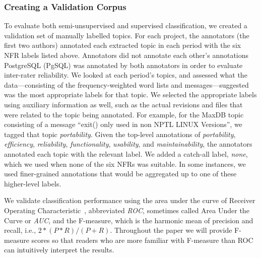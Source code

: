 \documentclass[smallextended]{svjour3}       %
\begin{document}

\subsubsection{Creating a Validation Corpus}
To evaluate both semi-unsupervised and supervised classification, we
created a validation set of manually labelled topics. For each project,
 the annotators (the first two authors) annotated each extracted topic in each period with
the six NFR labels listed above.
Annotators did not annotate each other's annotations
PostgreSQL (PgSQL) was annotated by both annotators in order
to evaluate inter-rater reliability.
We looked at each period's topics, and assessed what the data---consisting of the frequency-weighted word lists and messages---suggested was the most appropriate labels for that topic. 
We selected the appropriate labels using auxiliary information as well, such as the actual revisions and files that were related to the
topic being annotated.
For example, for the MaxDB topic consisting of a message ``exit() only
used in non NPTL LINUX Versions'', we tagged that topic
\emph{portability}. 
Given the top-level annotations of \emph{portability},
\emph{efficiency}, \emph{reliability}, \emph{functionality},
\emph{usability}, and \emph{maintainability}, the annotators annotated each topic
with the relevant label. We added a catch-all label, \emph{none}, which we used when none of the six NFRs was suitable. In some instances, we used finer-grained
annotations that would be aggregated up to one of these higher-level labels.

We validate classification performance using the area under the curve
of Receiver Operating
Characteristic~\cite{Fawcett2006861},
abbreviated \emph{ROC}, sometimes called Area Under the Curve or \emph{AUC}, and the
F-measure, which is the harmonic mean of precision and recall, i.e.,
$2 * (P * R) / (P + R)$. 
Throughout the paper we will provide F-measure scores so that readers
who are more familiar with F-measure than ROC can intuitively
interpret the results.
\end{document}
